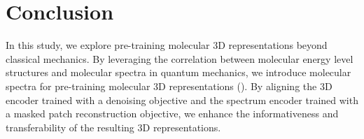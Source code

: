\section{Conclusion}
In this study, we explore pre-training molecular 3D representations beyond classical mechanics. By leveraging the correlation between molecular energy level structures and molecular spectra in quantum mechanics, we introduce molecular spectra for pre-training molecular 3D representations (\themodel). 
By aligning the 3D encoder trained with a denoising objective and the spectrum encoder trained with a masked patch reconstruction objective, we enhance the informativeness and transferability of the resulting 3D representations.
